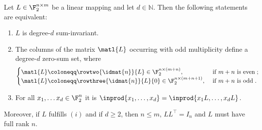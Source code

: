 \begin{proposition}
Let $L \in \F_2^{n \times m}$ be a linear mapping and let $d \in \mathbb{N}$.
Then the following statements are equivalent:
\enumroman
\begin{enumerate}
    \item $L$ is degree-$d$ sum-invariant.

    \item The columns of the matrix $\matl{L}$ occurring with odd multiplicity define a degree-$d$ zero-sum set, where
    \begin{equation}
    \begin{cases}
    \arraycolsep=4pt\def\arraystretch{1}
    \matl{L} \coloneqq \rowtwo{\idmat{n}}{L} \in \F_2^{n\times(m+n)},
    & \text{~if~} m+n \text{~is even}\;; \\
    \arraycolsep=4pt\def\arraystretch{1}
    \matl{L} \coloneqq \rowthree{\idmat{n}}{L}{0} \in \F_2^{n\times(m+n+1)},
    & \text{~if~} m+n \text{~is odd}\;.
    \end{cases}
    \end{equation}
    
    \item For all $x_1,\dots x_d \in \F_2^{n}$ it is $\inprod{ x_1,\dots,x_d} = \inprod{x_1 L,\dots,x_d L}$.
\end{enumerate}
Moreover, if $L$ fulfills $(i)$ and if $d \geq 2$, then $n \le m$, $LL^{\top} = I_{n}$ and $L$ must have full rank $n$. 
\end{proposition}
